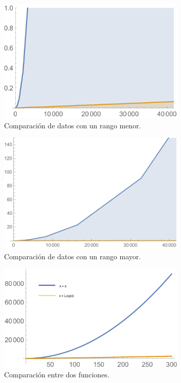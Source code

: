 \documentclass[12pt,letterpaper]{article}
\begin{document}
\begin{figure}[ht!]
  \centering
  \includegraphics[width=0.8\textwidth]{figures/primero.pdf}
  \caption{Comparaci\'on de datos con un rango menor.}
  \label{fig:primero}
\end{figure}
\begin{figure}[ht!]
  \centering
  \includegraphics[width=0.8\textwidth]{figures/big.pdf}
  \caption{Comparaci\'on de datos con un rango mayor.}
  \label{fig:segundo}
\end{figure}
\begin{figure}[ht!]
  \centering
  \includegraphics[width=0.8\textwidth]{figures/xx.pdf}
  \caption{Comparaci\'on entre dos funciones.}
  \label{fig:xx}
\end{figure}
\newpage
\end{document}
